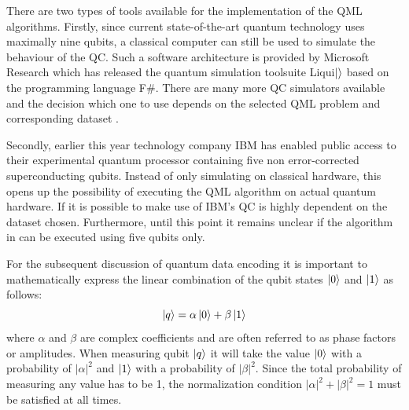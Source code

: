 \documentclass[a4paper]{article}
\newcommand*{\0}{$\ket{0}$}
\newcommand*{\1}{$\ket{1}$}
\begin{document}
There are two types of tools available for the implementation of the QML algorithms. Firstly, since current state-of-the-art quantum technology uses maximally nine qubits, a classical computer can still be used to simulate the behaviour of the QC. Such a software architecture is provided by Microsoft Research which has released the quantum simulation toolsuite Liqui$\ket{}$ based on the programming language F\#. There are many more QC simulators available and the decision which one to use depends on the selected QML problem and corresponding dataset \citep{quantiki}.

Secondly, earlier this year technology company IBM has enabled public access to their experimental quantum processor containing five non error-corrected superconducting qubits. Instead of only simulating on classical hardware, this opens up the possibility of executing the QML algorithm on actual quantum hardware. If it is possible to make use of IBM's QC is highly dependent on the dataset chosen. Furthermore, until this point it remains unclear if the algorithm in \cite{Schuld2016} can be executed using five qubits only.

For the subsequent discussion of quantum data encoding it is important to mathematically express the linear combination of the qubit states \0 and \1 as follows:
\begin{equation}
\label{equ: simplequbit}
\ket{q} = \alpha \ket{0} + \beta \ket{1}
\end{equation}
where $\alpha$ and $\beta$ are complex coefficients and are often referred to as phase factors or amplitudes. When measuring qubit $\ket{q}$ it will take the value \0 with a probability of ${|\alpha|}^{2}$ and \1 with a probability of ${|\beta|}^{2}$. Since the total probability of measuring any value has to be 1, the normalization condition ${|\alpha|}^{2} + {|\beta|}^{2} =  1$ must be satisfied at all times.
\end{document}
